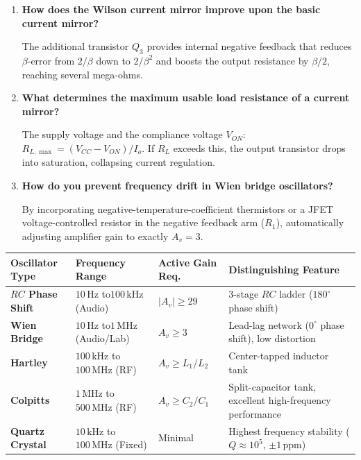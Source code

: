 \documentclass[12pt,a4paper]{article}
\newcommand{\Q}[1]{\textbf{#1}\par\noindent\ignorespaces}
\renewcommand{\arraystretch}{1.45}
\begin{document}
\begin{tcolorbox}[exambox, title={Frequently Asked / Viva Questions}]
\begin{enumerate}[topsep=0pt, label=\textbf{Q\arabic*.}, itemsep=5pt]
  \item \Q{How does the Wilson current mirror improve upon the basic current mirror?}
  The additional transistor $Q_3$ provides internal negative feedback that reduces $\beta$-error from $2/\beta$ down to $2/\beta^2$ and boosts the output resistance by $\beta/2$, reaching several mega-ohms.

  \item \Q{What determines the maximum usable load resistance of a current mirror?}
  The supply voltage and the compliance voltage $V_{ON}$: $R_{L,\max} = (V_{CC} - V_{ON}) / I_o$. If $R_L$ exceeds this, the output transistor drops into saturation, collapsing current regulation.

  \item \Q{How do you prevent frequency drift in Wien bridge oscillators?}
  By incorporating negative-temperature-coefficient thermistors or a JFET voltage-controlled resistor in the negative feedback arm ($R_1$), automatically adjusting amplifier gain to exactly $A_v = 3$.
\end{enumerate}
\end{tcolorbox}

\begin{tcolorbox}[tikzbox, title={Summary Comparison of RF and Audio Oscillators}]
\renewcommand{\arraystretch}{1.25}
\setlength{\tabcolsep}{5pt}
\noindent\begin{tabularx}{\linewidth}{|B{3.2cm}|B{3.25cm}|B{2.2cm}|Y|}
\hline
\textbf{Oscillator Type} & \textbf{Frequency Range} & \textbf{Active Gain Req.} & \textbf{Distinguishing Feature} \\
\hline
\textbf{$RC$ Phase Shift}& $10\,\mathrm{Hz}$ to\newline $100\,\mathrm{kHz}$ (Audio) & $|A_v| \ge 29$ & 3-stage $RC$ ladder ($180^\circ$ phase shift) \\
\hline
\textbf{Wien Bridge}     & $10\,\mathrm{Hz}$ to\newline $1\,\mathrm{MHz}$ (Audio/Lab)& $A_v \ge 3$ & Lead-lag network ($0^\circ$ phase shift), low distortion \\
\hline
\textbf{Hartley}         & $100\,\mathrm{kHz}$ to\newline $100\,\mathrm{MHz}$ (RF)  & $A_v \ge L_1/L_2$ & Center-tapped inductor tank \\
\hline
\textbf{Colpitts}        & $1\,\mathrm{MHz}$ to\newline $500\,\mathrm{MHz}$ (RF)    & $A_v \ge C_2/C_1$ & Split-capacitor tank, excellent high-frequency performance \\
\hline
\textbf{Quartz Crystal}  & $10\,\mathrm{kHz}$ to\newline $100\,\mathrm{MHz}$ (Fixed) & Minimal & Highest frequency stability ($Q \approx 10^5$, $\pm 1\,\mathrm{ppm}$) \\
\hline
\end{tabularx}\par
\end{tcolorbox}
\end{document}
